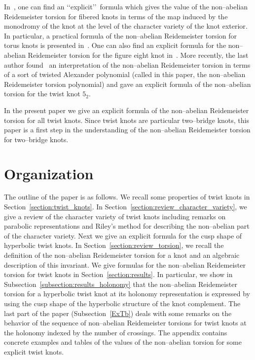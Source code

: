 \documentclass[a4paper]{amsart}
\theoremstyle{plain}
\theoremstyle{definition}
\theoremstyle{remark}
\begin{document}
In~\cite[Main Theorem]{JDFibre},  one can find an \lq\lq explicit\rq\rq\, formula which gives the value of {the non--abelian Reidemeister} torsion for fibered knots in terms of the map induced by the monodromy of the knot at the level of the character variety of the knot exterior. In particular, a practical formula of the non--abelian Reidemeister torsion for torus knots is presented in~\cite[Section 6.2]{JDFibre}.
One can also find an explicit formula for the non--abelian Reidemeister torsion for the figure eight knot in~\cite[Section 7]{JDFibre}. More recently, the last author found~\cite[Theorem 3.1.2]{YY1} an interpretation of the non--abelian Reidemeister torsion in terms of a sort of twisted Alexander polynomial (called in this paper, the non--abelian Reidemeister torsion polynomial) and gave an explicit formula of the non--abelian torsion for the twist knot $5_2$. 
    
    In the present paper we give an explicit formula of the non--abelian Reidemeister torsion for all twist knots. Since twist knots are particular two--bridge knots, this paper is a first step in the understanding of the non--abelian Reidemeister torsion for two--bridge knots. 

    
\section*{Organization} 

The outline of the paper is as follows. We recall some properties of twist knots in Section~\ref{section:twist_knots}.
In Section~\ref{section:review_character_variety}, we give a review of the character variety of twist knots including remarks on parabolic representations and Riley's method for describing the non--abelian part of the character variety. Next we give an explicit formula for
the cusp shape of hyperbolic twist knots.
In Section~\ref{section:review_torsion}, we recall the definition of 
the non--abelian Reidemeister torsion for a knot and an algebraic
description of this invariant.
We give formulas for the non--abelian Reidemeister torsion for twist knots 
in Section~\ref{section:results}.
In particular, we show in Subsection~\ref{subsection:results_holonomy} that the non--abelian Reidemeister torsion for a hyperbolic twist knot at its holonomy representation is expressed by using the cusp shape of the hyperbolic structure of the knot complement. The last part of the paper (Subsection~\ref{ExTb}) deals with some remarks on the behavior of the sequence of non--abelian Reidemeister torsions for twist knots at the holonomy indexed by the number of crossings. The appendix contains concrete examples and tables of the values of the non--abelian torsion for some explicit twist knots.
\end{document}
